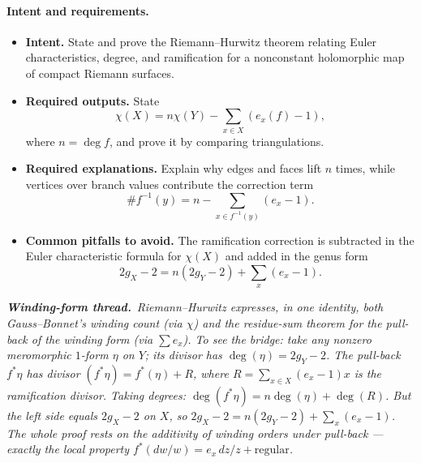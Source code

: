 \documentclass[11pt]{article}
\newcommand{\windingnote}[1]{%
\par\smallskip
\noindent\begin{minipage}{\linewidth}%
\color{windingblue}\small%
\textbf{\textit{Winding-form thread.}}\ \textit{#1}%
\end{minipage}\par\smallskip%
}
\newenvironment{intentrequirements}{%
\paragraph{Intent and requirements.}
\begin{itemize}[leftmargin=*, itemsep=0.25em]
}{%
\end{itemize}
}
\begin{document}
\begin{intentrequirements}
\item \textbf{Intent.} State and prove the Riemann--Hurwitz theorem relating Euler characteristics, degree, and ramification for a nonconstant holomorphic map of compact Riemann surfaces.
\item \textbf{Required outputs.} State
\[
 \chi(X)=n\chi(Y)-\sum_{x\in X}(e_x(f)-1),
\]
where $n=\deg f$, and prove it by comparing triangulations.
\item \textbf{Required explanations.} Explain why edges and faces lift $n$ times, while vertices over branch values contribute the correction term
\[
 \#f^{-1}(y)=n-\sum_{x\in f^{-1}(y)}(e_x-1).
\]
\item \textbf{Common pitfalls to avoid.} The ramification correction is subtracted in the Euler characteristic formula for $\chi(X)$ and added in the genus form
\[
 2g_X-2=n(2g_Y-2)+\sum_x(e_x-1).
\]
\end{intentrequirements}

\windingnote{Riemann--Hurwitz expresses, in one identity, both Gauss--Bonnet's winding count (via $\chi$) and the residue-sum theorem for the pull-back of the winding form (via $\sum e_x$). To see the bridge: take any nonzero meromorphic $1$-form $\eta$ on $Y$; its divisor has $\deg(\eta)=2g_Y-2$. The pull-back $f^*\eta$ has divisor $(f^*\eta)=f^*(\eta)+R$, where $R=\sum_{x\in X}(e_x-1)x$ is the ramification divisor. Taking degrees: $\deg(f^*\eta)=n\deg(\eta)+\deg(R)$. But the left side equals $2g_X-2$ on $X$, so $2g_X-2=n(2g_Y-2)+\sum_x(e_x-1)$. The whole proof rests on the additivity of winding orders under pull-back --- exactly the local property $f^*(dw/w)=e_x\,dz/z+\text{regular}$.}
\end{document}
